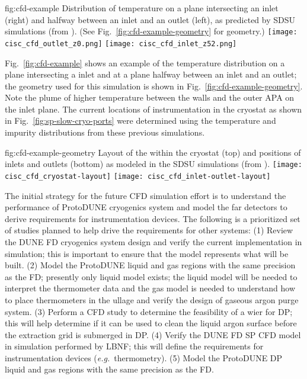 \begin{dunefigure}{fig:cfd-example}
  {Distribution of temperature on a plane intersecting an inlet (right) and halfway between an inlet and an outlet (left), as predicted by SDSU  simulations (from \cite{docdb-5915}). (See Fig.\ \ref{fig:cfd-example-geometry} for geometry.)}
  \texttt{[image: cisc\_cfd\_outlet\_z0.png]}
  \texttt{[image: cisc\_cfd\_inlet\_z52.png]}
\end{dunefigure}

Fig.\ \ref{fig:cfd-example} shows an example of the temperature
distribution on a plane intersecting a  inlet and at a
plane halfway between an inlet and an outlet; the geometry used for
this simulation is shown in Fig.\ \ref{fig:cfd-example-geometry}.
Note the plume of higher temperature  between the walls and
the outer APA on the inlet plane.  The current locations of instrumentation in
the cryostat as shown in Fig.\ \ref{fig:sp-slow-cryo-ports} were
determined using the temperature and impurity distributions from these
previous simulations.

\begin{dunefigure}{fig:cfd-example-geometry}
  {Layout of the  within the cryostat (top) and positions of
     inlets and outlets (bottom) as modeled in the SDSU
     simulations (from \cite{docdb-5915}).}
  \texttt{[image: cisc\_cfd\_cryostat-layout]}
  \texttt{[image: cisc\_cfd\_inlet-outlet-layout]}
\end{dunefigure}

The initial strategy for the future CFD simulation effort is to understand the performance of ProtoDUNE cryogenics system and model the far detectors to derive requirements for instrumentation devices.
The following is a prioritized set of studies planned to help drive the requirements for other systems:
(1) Review the DUNE FD cryogenics system design and verify the current implementation in simulation; this is important to ensure that the model represents what will be built.
(2) Model the ProtoDUNE liquid and gas regions with the same precision as the FD; presently only liquid model exists; the liquid model will be needed to interpret the thermometer data and the gas model is needed to understand how to place thermometers in the ullage and verify the design of gaseous argon purge system.
(3) Perform a CFD study to determine the feasibility of a wier for DP; this will help determine if it can be used to clean the liquid argon surface before the extraction grid is submerged in DP.
(4) Verify the DUNE FD SP CFD model in simulation performed by LBNF; this will define the requirements for instrumentation devices ({\em e.g.}\ thermometry).
(5) Model the ProtoDUNE DP liquid and gas regions with the same precision as the FD.
